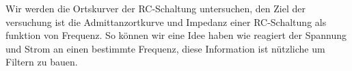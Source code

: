 %
Wir werden die Ortskurver der RC-Schaltung untersuchen, den Ziel der versuchung ist die Admittanzortkurve und Impedanz einer RC-Schaltung als funktion von Frequenz.
So können wir eine Idee haben wie reagiert der Spannung und Strom an einen bestimmte Frequenz, diese Information ist nützliche um Filtern zu bauen.
%
%
%
%
\begin{flushright}
  \textit{\autorA}
\end{flushright}
%
%
%